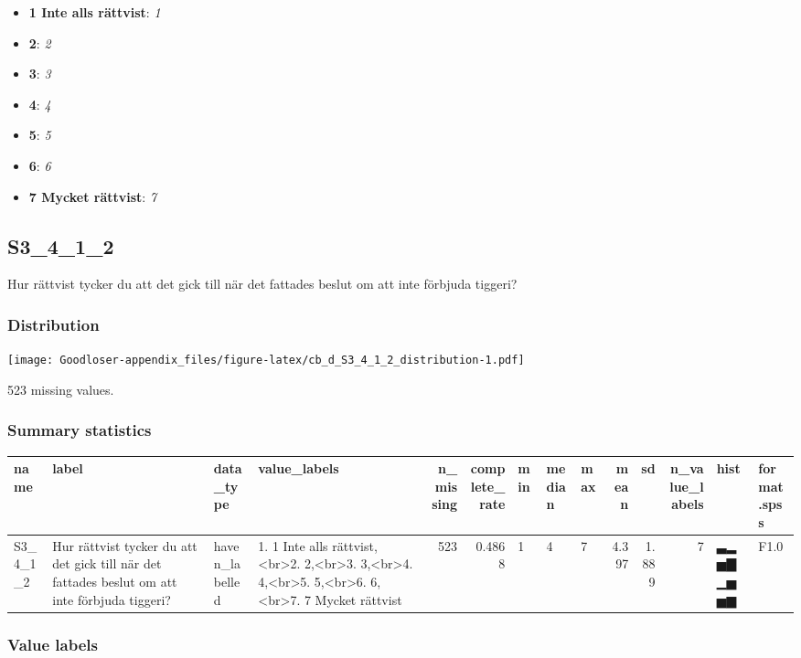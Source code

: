 \documentclass[
]{book}
\providecommand{\tightlist}{%
  \setlength{\itemsep}{0pt}\setlength{\parskip}{0pt}}
\begin{document}
\begin{itemize}
\tightlist
\item
  \textbf{1 Inte alls rättvist}: \emph{1}
\item
  \textbf{2}: \emph{2}
\item
  \textbf{3}: \emph{3}
\item
  \textbf{4}: \emph{4}
\item
  \textbf{5}: \emph{5}
\item
  \textbf{6}: \emph{6}
\item
  \textbf{7 Mycket rättvist}: \emph{7}
\end{itemize}

\hypertarget{S3_4_1_2}{%
\subsection{S3\_4\_1\_2}\label{S3_4_1_2}}

Hur rättvist tycker du att det gick till när det fattades beslut om att inte förbjuda tiggeri?

\hypertarget{S3_4_1_2_distribution}{%
\subsubsection{Distribution}\label{S3_4_1_2_distribution}}

\texttt{[image: Goodloser-appendix\_files/figure-latex/cb\_d\_S3\_4\_1\_2\_distribution-1.pdf]}

523 missing values.

\hypertarget{S3_4_1_2_summary}{%
\subsubsection{Summary statistics}\label{S3_4_1_2_summary}}

\begin{tabular}{l|l|l|l|r|r|l|l|l|r|r|r|l|l}
\hline
name & label & data_type & value_labels & n_missing & complete_rate & min & median & max & mean & sd & n_value_labels & hist & format.spss\\
\hline
S3_4_1_2 & Hur rättvist tycker du att det gick till när det fattades beslut om att inte förbjuda tiggeri? & haven_labelled & 1. 1 Inte alls rättvist,<br>2. 2,<br>3. 3,<br>4. 4,<br>5. 5,<br>6. 6,<br>7. 7 Mycket rättvist & 523 & 0.4868 & 1 & 4 & 7 & 4.397 & 1.889 & 7 & ▃▂▅▇▁▅▅▆ & F1.0\\
\hline
\end{tabular}

\hypertarget{S3_4_1_2_labels}{%
\subsubsection{Value labels}\label{S3_4_1_2_labels}}
\end{document}
